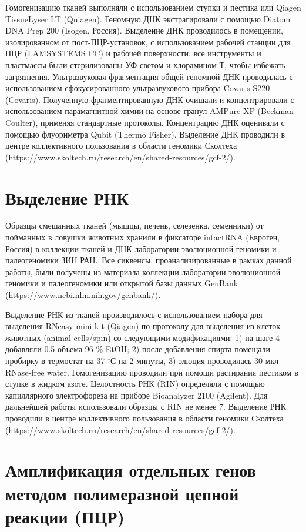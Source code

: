 Гомогенизацию тканей выполняли с использованием ступки и пестика или Qiagen TissueLyser LT (Quiagen). Геномную ДНК экстрагировали с помощью Diatom DNA Prep 200 (Isogen, Россия). Выделение ДНК проводилось в помещении, изолированном от пост-ПЦР-установок, с использованием рабочей станции для ПЦР (LAMSYSTEMS CC) и рабочей поверхности, все инструменты и пластмассы были стерилизованы УФ-светом и хлорамином-Т, чтобы избежать загрязнения. Ультразвуковая фрагментация общей геномной ДНК проводилась с использованием сфокусированного ультразвукового прибора Covaris S220 (Covaris). Полученную фрагментированную ДНК очищали и концентрировали с использованием парамагнитной химии на основе гранул AMPure XP (Beckman-Coulter), применяя стандартные протоколы. Концентрацию ДНК оценивали с помощью флуориметра Qubit (Thermo Fisher). Выделение ДНК проводили в центре коллективного пользования в области геномики Сколтеха (https://www.skoltech.ru/research/en/shared-resources/gcf-2/). 

\section{Выделение РНК}

Образцы смешанных тканей (мышцы, печень, селезенка, семенники) от пойманных в ловушки животных хранили в фиксаторе intactRNA (Евроген, Россия) в коллекции тканей и ДНК лаборатории эволюционной геномики и палеогеномики  ЗИН РАН. Все сиквенсы, проанализированные в рамках данной работы, были получены из материала коллекции лаборатории эволюционной геномики и палеогеномики или открытой базы данных GenBank (https://www.ncbi.nlm.nih.gov/genbank/).

Выделение РНК из тканей производилось с использованием набора для выделения RNeasy mini kit (Qiagen) по протоколу для выделения из клеток животных (animal cells/spin) со следующими модификациями: 1) на шаге 4 добавляли 0.5 объема 96 \% EtOH; 2) после добавления спирта помещали пробирку в термостат на 37 $^\circ$С на 2 минуты, 3) элюция проводилась 30 мкл RNase-free water. Гомогенизацию проводили при помощи растирания пестиком в ступке в жидком азоте. Целостность РНК (RIN) определяли с помощью капиллярного электрофореза на приборе Bioanalyzer 2100 (Agilent). Для дальнейшей работы использовали образцы с RIN не менее 7. Выделение РНК проводили в центре коллективного пользования в области геномики Сколтеха (https://www.skoltech.ru/research/en/shared-resources/gcf-2/).

\section{Амплификация отдельных генов методом полимеразной цепной реакции (ПЦР)}

